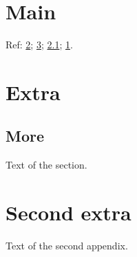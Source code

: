 \documentclass{report}
\begin{document}
\chapter{Main}\label{main}
Ref: \ref{app:a}; \ref{app:b}; \ref{sec:a}; \ref{main}.
\setcounter{chapter}{0}
\renewcommand\thechapter{\Alph{chapter}}
\chapter{Extra}\label{app:a}
\section{More}\label{sec:a}
Text of the section.
\chapter{Second extra}\label{app:b}
Text of the second appendix.
\end{document}

